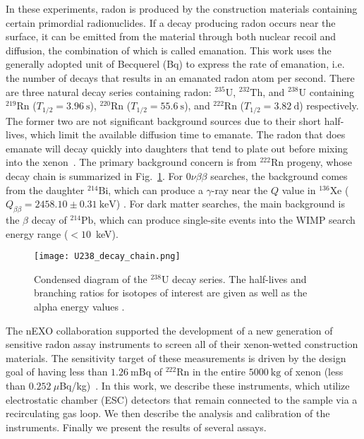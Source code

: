 \documentclass[final,3p,times]{elsarticle}
\begin{document}
In these experiments, radon is produced by the construction materials containing certain primordial radionuclides. 
If a decay producing radon occurs near the surface, it can be emitted from the material through both nuclear recoil and diffusion, the combination of which is called emanation.
This work uses the generally adopted unit of Becquerel (Bq) to express the rate of emanation, i.e. the number of decays that results in an emanated radon atom per second.
There are three natural decay series containing radon: $^{235}\text{U}$, $^{232}\text{Th}$, and $^{238}\text{U}$ containing $^{219}\text{Rn}$ ($T_{1/2}=3.96~\mathrm{s}$), $^{220}\text{Rn}$ ($T_{1/2}=55.6~\mathrm{s}$), and $^{222}\text{Rn}$ ($T_{1/2}=3.82~\mathrm{d}$) respectively. 
The former two are not significant background sources due to their short half-lives, which limit the available diffusion time to emanate.
The radon that does emanate will decay quickly into daughters that tend to plate out before mixing into the xenon~\cite{LZ_RBC_Program}. 
The primary background concern is from $^{222}\text{Rn}$ progeny, whose decay chain is summarized in Fig.~\ref{fig:decay_chain}. 
For $0\nu\beta\beta$ searches, the background comes from the daughter $^{214}\text{Bi}$, which can produce a $\gamma$-ray near the $Q$ value in $^{136}\text{Xe}$ ($Q_{\beta\beta}= 2458.10\pm0.31~\mathrm{keV}$) \cite{q_val1}. 
For dark matter searches, the main background is the $\beta$ decay of $^{214}\text{Pb}$, which can produce single-site events into the WIMP search energy range ($<10$~keV). 

\begin{figure}
\centering
  \texttt{[image: U238\_decay\_chain.png]}
  \caption{Condensed diagram of the $^{238}\text{U}$ decay series. The half-lives and branching ratios for isotopes of interest are given as well as the alpha energy values \cite{ensdf}.}
  \label{fig:decay_chain}
\end{figure}

The nEXO collaboration supported the development of a new generation of sensitive radon assay instruments to screen all of their xenon-wetted construction materials. 
The sensitivity target of these measurements is driven by the design goal of having less than $1.26~\mathrm{m Bq}$ of $^{222}\text{Rn}$ in the entire $5000~\mathrm{kg}$ of xenon (less than $0.252~\mu$Bq/kg)~\cite{nEXO_PCDR,nEXO_Rn}.   
In this work, we describe these instruments, which utilize electrostatic chamber (ESC) detectors that remain connected to the sample via a recirculating gas loop.
We then describe the analysis and calibration of the instruments.
Finally we present the results of several assays.
\end{document}
